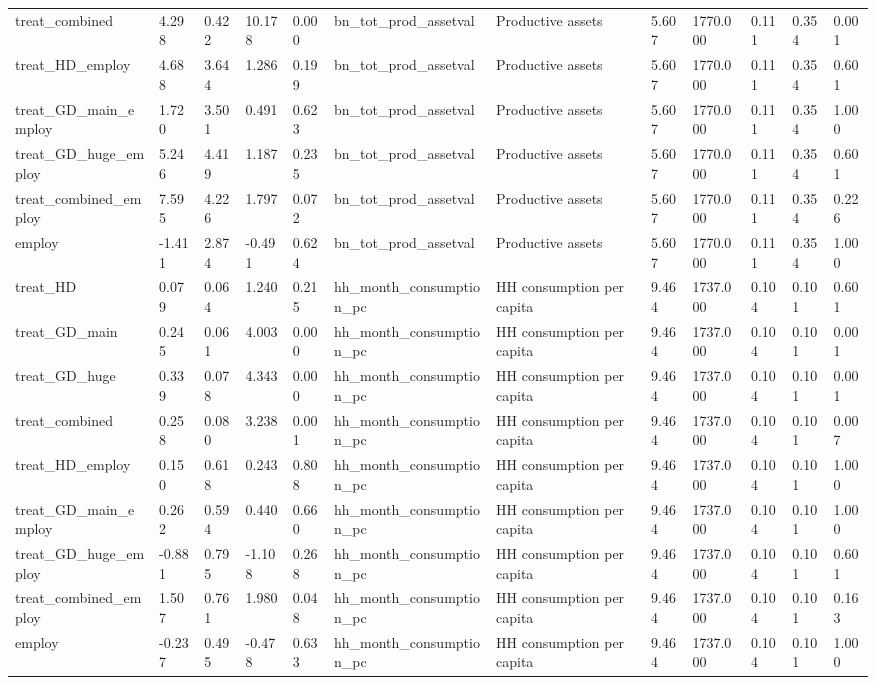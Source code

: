 \begin{tabular}{llllllllllll}
treat\_combined & 4.298 & 0.422 & 10.178 & 0.000 & bn\_tot\_prod\_assetval & Productive assets & 5.607 & 1770.000 & 0.111 & 0.354 & 0.001 \\
treat\_HD\_employ & 4.688 & 3.644 & 1.286 & 0.199 & bn\_tot\_prod\_assetval & Productive assets & 5.607 & 1770.000 & 0.111 & 0.354 & 0.601 \\
treat\_GD\_main\_employ & 1.720 & 3.501 & 0.491 & 0.623 & bn\_tot\_prod\_assetval & Productive assets & 5.607 & 1770.000 & 0.111 & 0.354 & 1.000 \\
treat\_GD\_huge\_employ & 5.246 & 4.419 & 1.187 & 0.235 & bn\_tot\_prod\_assetval & Productive assets & 5.607 & 1770.000 & 0.111 & 0.354 & 0.601 \\
treat\_combined\_employ & 7.595 & 4.226 & 1.797 & 0.072 & bn\_tot\_prod\_assetval & Productive assets & 5.607 & 1770.000 & 0.111 & 0.354 & 0.226 \\
employ & -1.411 & 2.874 & -0.491 & 0.624 & bn\_tot\_prod\_assetval & Productive assets & 5.607 & 1770.000 & 0.111 & 0.354 & 1.000 \\
treat\_HD & 0.079 & 0.064 & 1.240 & 0.215 & hh\_month\_consumption\_pc & HH consumption per capita & 9.464 & 1737.000 & 0.104 & 0.101 & 0.601 \\
treat\_GD\_main & 0.245 & 0.061 & 4.003 & 0.000 & hh\_month\_consumption\_pc & HH consumption per capita & 9.464 & 1737.000 & 0.104 & 0.101 & 0.001 \\
treat\_GD\_huge & 0.339 & 0.078 & 4.343 & 0.000 & hh\_month\_consumption\_pc & HH consumption per capita & 9.464 & 1737.000 & 0.104 & 0.101 & 0.001 \\
treat\_combined & 0.258 & 0.080 & 3.238 & 0.001 & hh\_month\_consumption\_pc & HH consumption per capita & 9.464 & 1737.000 & 0.104 & 0.101 & 0.007 \\
treat\_HD\_employ & 0.150 & 0.618 & 0.243 & 0.808 & hh\_month\_consumption\_pc & HH consumption per capita & 9.464 & 1737.000 & 0.104 & 0.101 & 1.000 \\
treat\_GD\_main\_employ & 0.262 & 0.594 & 0.440 & 0.660 & hh\_month\_consumption\_pc & HH consumption per capita & 9.464 & 1737.000 & 0.104 & 0.101 & 1.000 \\
treat\_GD\_huge\_employ & -0.881 & 0.795 & -1.108 & 0.268 & hh\_month\_consumption\_pc & HH consumption per capita & 9.464 & 1737.000 & 0.104 & 0.101 & 0.601 \\
treat\_combined\_employ & 1.507 & 0.761 & 1.980 & 0.048 & hh\_month\_consumption\_pc & HH consumption per capita & 9.464 & 1737.000 & 0.104 & 0.101 & 0.163 \\
employ & -0.237 & 0.495 & -0.478 & 0.633 & hh\_month\_consumption\_pc & HH consumption per capita & 9.464 & 1737.000 & 0.104 & 0.101 & 1.000 \\
\bottomrule
\end{tabular}
